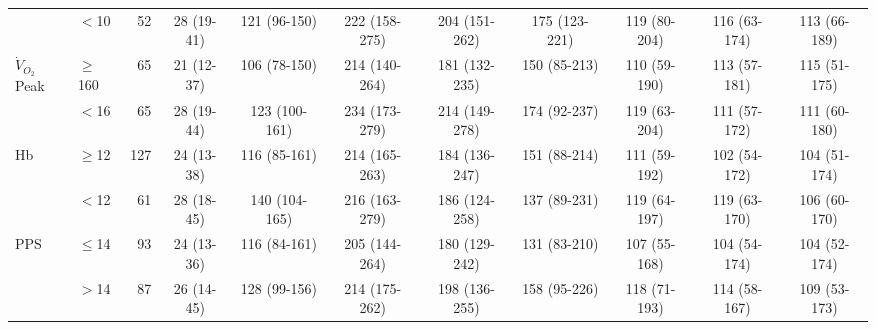\begin{sidewaystable}[p]
\begin{tabular}{|llr | cccccccc|}
		                    & $<$10     & 52  & 28 (19-41) & 121 (96-150)  & 222 (158-275) & 204 (151-262) & 175 (123-221) & 119 (80-204)  & 116 (63-174) & 113 (66-189)  \\
		$\dot{V}_{O_2}$Peak & $\geq$160 & 65  & 21 (12-37) & 106 (78-150)  & 214 (140-264) & 181 (132-235) & 150 (85-213)  & 110 (59-190)  & 113 (57-181) & 115 (51-175)  \\
		                    & $<$16     & 65  & 28 (19-44) & 123 (100-161) & 234 (173-279) & 214 (149-278) & 174 (92-237)  & 119 (63-204)  & 111 (57-172) & 111 (60-180)  \\
		Hb                  & $\geq$12  & 127 & 24 (13-38) & 116 (85-161)  & 214 (165-263) & 184 (136-247) & 151 (88-214)  & 111 (59-192)  & 102 (54-172) & 104 (51-174)  \\
		                    & $<$12     & 61  & 28 (18-45) & 140 (104-165) & 216 (163-279) & 186 (124-258) & 137 (89-231)  & 119 (64-197)  & 119 (63-170) & 106 (60-170)  \\
		PPS                 & $\leq$14  & 93  & 24 (13-36) & 116 (84-161)  & 205 (144-264) & 180 (129-242) & 131 (83-210)  & 107 (55-168)  & 104 (54-174) & 104 (52-174)  \\
		                    & $>$14     & 87  & 26 (14-45) & 128 (99-156)  & 214 (175-262) & 198 (136-255) & 158 (95-226)  & 118 (71-193)  & 114 (58-167) & 109 (53-173)  \\ \hline
	\end{tabular}	
\end{sidewaystable}





























